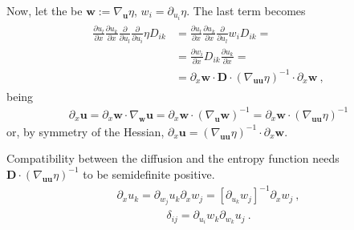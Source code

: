 \documentclass[letterpaper,10pt,english]{jupyterBook}
\begin{document}
\sphinxAtStartPar
Now, let the  be \(\mathbf{w} := \nabla_{\mathbf{u}} \eta\), \(w_i = \partial_{u_i} \eta\). The last term becomes
\begin{equation*}
\begin{split}\begin{aligned}
  \frac{\partial u_l}{\partial x} \frac{\partial u_k}{\partial x} \frac{\partial}{\partial u_l} \frac{\partial}{\partial u_i} \eta D_{ik} 
  & = \frac{\partial u_l}{\partial x} \frac{\partial u_k}{\partial x} \frac{\partial}{\partial u_l} w_i D_{ik} = \\
  & = \frac{\partial w_i}{\partial x} D_{ik} \frac{\partial u_k}{\partial x} = \\
  & = \partial_x \mathbf{w} \cdot \mathbf{D} \cdot \left( \nabla_{\mathbf{u} \mathbf{u}} \eta \right)^{-1} \cdot \partial_x \mathbf{w} \ ,
\end{aligned}\end{split}
\end{equation*}
\sphinxAtStartPar
being
\begin{equation*}
\begin{split}\partial_x \mathbf{u} = \partial_x \mathbf{w} \cdot \nabla_{\mathbf{w}} \mathbf{u} = \partial_x \mathbf{w} \cdot \left( \nabla_{\mathbf{u}} \mathbf{w} \right)^{-1} = \partial_x \mathbf{w} \cdot \left( \nabla_{\mathbf{u} \mathbf{u}} \eta \right)^{-1}\end{split}
\end{equation*}
\sphinxAtStartPar
or, by symmetry of the Hessian, \(\partial_x \mathbf{u} = \left( \nabla_{\mathbf{u} \mathbf{u}} \eta \right)^{-1} \cdot \partial_x \mathbf{w}\).

\sphinxAtStartPar
Compatibility between the diffusion and the entropy function needs \(\mathbf{D} \cdot \left( \nabla_{\mathbf{u} \mathbf{u}} \eta \right)^{-1}\) to be semi\sphinxhyphen{}definite positive.
\begin{equation*}
\begin{split}\partial_x u_k = \partial_{w_j} u_k \partial_x w_j = \left[ \partial_{u_k} w_j \right]^{-1} \partial_x w_j \ ,\end{split}
\end{equation*}\begin{equation*}
\begin{split}\delta_{ij} = \partial_{u_i} w_k \partial_{w_k} u_j \ .\end{split}
\end{equation*}
\end{document}
